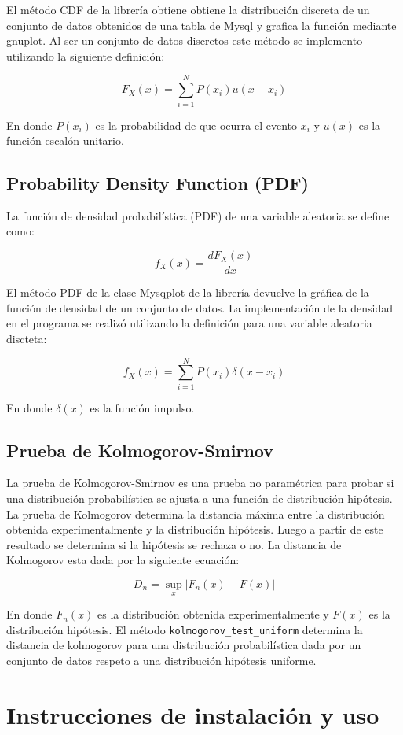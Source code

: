 \documentclass[a4paper,titlepage]{article}
\begin{document}
El método CDF de la librería obtiene obtiene la distribución discreta de un conjunto 
de datos obtenidos de una tabla de Mysql y grafica la función mediante gnuplot. 
Al ser un conjunto de datos discretos este método se implemento utilizando la siguiente 
definición:

$$ F_X(x) = \sum_{i=1}^N P(x_i)u(x-x_i) $$

En donde $P(x_i)$ es la probabilidad de que ocurra el evento $x_i$ y $u(x)$ es la 
función escalón unitario.

\subsection{Probability Density Function (PDF)}

La función de densidad probabilística (PDF) de una variable aleatoria se define como:

$$ f_X(x) = \frac{dF_X(x)}{dx} $$

El método PDF de la clase Mysqplot de la librería devuelve la gráfica de la 
función de densidad de un conjunto de datos. La implementación de la densidad en el 
programa se realizó utilizando la definición para una variable aleatoria discteta:

$$ f_X(x) = \sum_{i=1}^N P(x_i)\delta(x-x_i) $$

En donde $\delta(x)$ es la función impulso. 

\subsection{Prueba de Kolmogorov-Smirnov}

La prueba de Kolmogorov-Smirnov es una prueba no paramétrica para probar si una 
distribución probabilística se ajusta a una función de distribución hipótesis. La prueba de 
Kolmogorov determina la distancia máxima entre la distribución obtenida experimentalmente y 
la distribución hipótesis. Luego a partir de este resultado se determina si la 
hipótesis se rechaza o no. La distancia de Kolmogorov esta dada por la siguiente ecuación:

$$ D_n = \sup_x{|F_n(x)-F(x)|} $$

En donde $F_n(x)$ es la distribución obtenida experimentalmente y $F(x)$ es la 
distribución hipótesis. El método \texttt{kolmogorov\_test\_uniform} determina la distancia 
de kolmogorov para una distribución probabilística dada por un conjunto de datos respeto 
a una distribución hipótesis uniforme.

\section{Instrucciones de instalación y uso}
\end{document}
